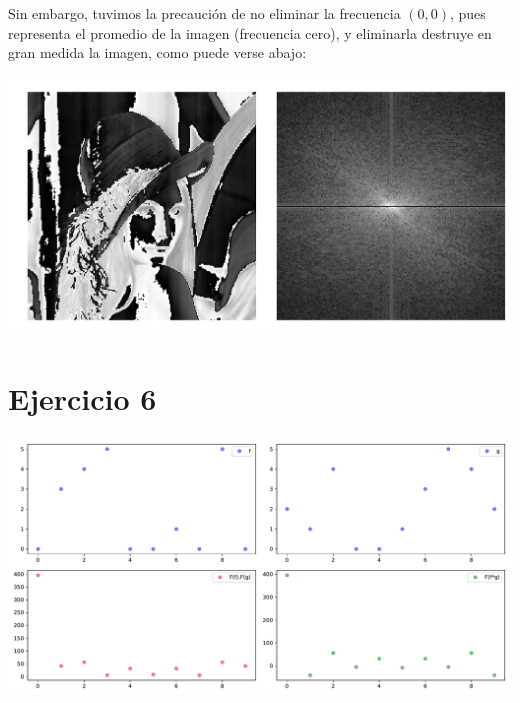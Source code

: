 \documentclass[a4paper]{article}
\begin{document}
Sin embargo, tuvimos la precaución de no eliminar la frecuencia $(0,0)$, pues representa el promedio de la imagen (frecuencia cero), y eliminarla destruye en gran medida la imagen, como puede verse abajo:
\begin{center}

	\includegraphics[scale=0.4]{imgs/ej5-bis.png}
\end{center}


\section{Ejercicio 6}
\begin{center}

	\includegraphics[scale=0.5]{imgs/6.pdf}

\end{center}
\end{document}
